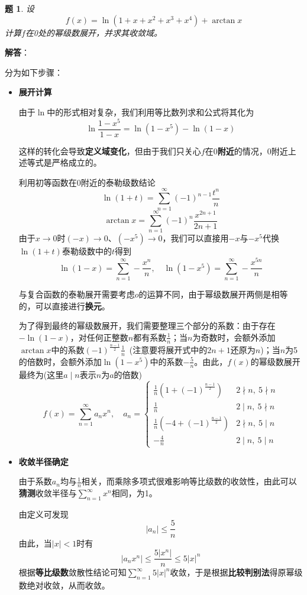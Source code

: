 \documentclass[a4paper,UTF8,fontset=windows,AutoFakeBold]{ctexart}
\newcommand*{\suminf}[1][n=1]{\sum_{#1}^\infty}
\newcommand*{\note}{\noindent *}
\theoremstyle{ex}
\newtheorem{exercise}{题}
\newcommand{\sol}[1]{{\vspace{5pt}\kaishu\noindent\textbf{解答}：\vspace{-3pt}
\begin{compactitem}
    \item[] #1
\end{compactitem}
}}
\begin{document}
\begin{framed}
\begin{exercise}
    设
    $$f(x)=\ln(1+x+x^2+x^3+x^4)+\arctan x$$
    计算$f$在0处的幂级数展开，并求其收敛域。
\end{exercise}
\sol{
    分为如下步骤：
    \begin{itemize}
        \item \textbf{展开计算}
        
        由于$\ln$中的形式相对复杂，我们利用等比数列求和公式将其化为
        $$\ln\frac{1-x^5}{1-x}=\ln(1-x^5)-\ln(1-x)$$

        \note 这样的转化会导致\textbf{定义域变化}，但由于我们只关心$f$在\textbf{$0$附近}的情况，0附近上述等式是严格成立的。

        利用初等函数在0附近的泰勒级数结论
        $$\ln(1+t)=\suminf(-1)^{n-1}\frac{t^n}{n}$$
        $$\arctan x=\suminf(-1)^n\frac{x^{2n+1}}{2n+1}$$
        由于$x\to0$时$(-x)\to0$、$(-x^5)\to0$，我们可以直接用$-x$与$-x^5$代换$\ln(1+t)$泰勒级数中的$t$得到
        $$\ln(1-x)=\suminf-\frac{x^n}{n},\quad\ln(1-x^5)=\suminf-\frac{x^{5n}}{n}$$

        \note 与复合函数的泰勒展开需要考虑$o$的运算不同，由于幂级数展开两侧是相等的，可以直接进行\textbf{换元}。

        为了得到最终的幂级数展开，我们需要整理三个部分的系数：由于存在$-\ln(1-x)$，对任何正整数$n$都有系数$\frac{1}{n}$；当$n$为奇数时，会额外添加$\arctan x$中的系数$(-1)^{\frac{n-1}{2}}\frac{1}{n}$\ (注意要将展开式中的$2n+1$还原为$n$)；当$n$为5的倍数时，会额外添加$\ln(1-x^5)$中的系数$-\frac{5}{n}$。由此，$f(x)$的幂级数展开最终为(这里$a\mid n$表示$n$为$a$的倍数)
        $$f(x)=\suminf a_nx^n,\quad a_n=\begin{cases}\frac{1}{n}(1+(-1)^{\frac{n-1}{2}})&2\nmid n,\ 5\nmid n\\\frac{1}{n}&2\mid n,\ 5\nmid n\\\frac{1}{n}(-4+(-1)^{\frac{n-1}{2}})&2\nmid n,\ 5\mid n\\-\frac{4}{n}&2\mid n,\ 5\mid n\end{cases}$$

        \item \textbf{收敛半径确定}
        
        \note 由于系数$a_n$均与$\frac{1}{n}$相关，而乘除多项式很难影响等比级数的收敛性，由此可以\textbf{猜测}收敛半径与$\suminf x^n$相同，为1。
        
        由定义可发现
        $$|a_n|\le\frac{5}{n}$$
        由此，当$|x|<1$时有
        $$|a_nx^n|\le\frac{5|x^n|}{n}\le 5|x|^n$$
        根据\textbf{等比级数}敛散性结论可知$\suminf5|x|^n$收敛，于是根据\textbf{比较判别法}得原幂级数绝对收敛，从而收敛。


\end{itemize}}
\end{framed}
\end{document}
